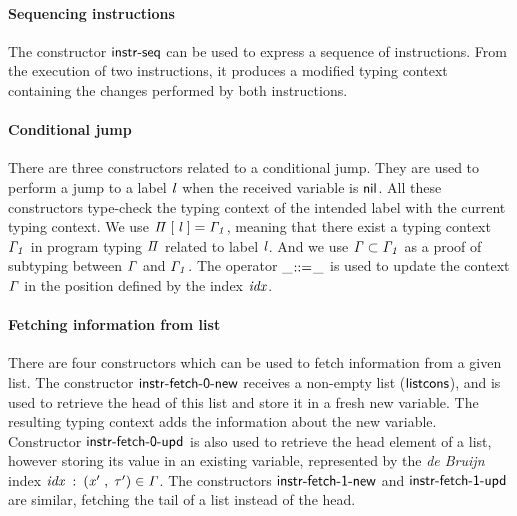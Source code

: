 \documentclass[sigconf]{acmart}
\theoremstyle{definition}
\newcommand{\D}[1]{\blue{\mathsf{#1}}}
\newcommand{\Con}[1]{\red{\mathsf{#1}}}
\newcommand{\F}[1]{\green{\mathsf{#1}}}
\newcommand{\V}[1]{\purple{\mathit{#1}}}
\begin{document}
\paragraph{Sequencing instructions}{The constructor \ensuremath{\Con{instr\textrm{-}seq}} can be used to
express a sequence of instructions. From the execution of two instructions, it
produces a modified typing context containing the changes performed by
both instructions.}

\paragraph{Conditional jump}{There are three constructors related to a conditional
jump. They are used to perform a jump to a label \ensuremath{\V{l}} when the received variable is \ensuremath{\Con{nil}}.
All these constructors type-check the typing context of the intended label with the
current typing context. We use \ensuremath{\V{\Pi}\;\D{[}\;\V{l}\;\D{]=}\;\V{\Gamma_1}}, meaning that there exist a typing context
\ensuremath{\V{\Gamma_1}} in program typing \ensuremath{\V{\Pi}} related to label \ensuremath{\V{l}}. And we use \ensuremath{\V{\Gamma}\;\D{\subset}\;\V{\Gamma_1}} as a proof of
subtyping between \ensuremath{\V{\Gamma}} and \ensuremath{\V{\Gamma_1}}. The operator \ensuremath{\F{\_\hspace{-2pt}::=\hspace{-2pt}\_}} is used to update the context \ensuremath{\V{\Gamma}}
in the position defined by the index \ensuremath{\V{idx}}.}

\paragraph{Fetching information from list}{There are four constructors which can be used
to fetch information from a given list. The constructor \ensuremath{\Con{instr\textrm{-}fetch\textrm{-}0\textrm{-}new}} receives a
non-empty list (\ensuremath{\Con{listcons}}), and is used to retrieve the head of this list and store it
in a fresh new variable. The resulting typing context adds the information about the new
variable. Constructor \ensuremath{\Con{instr\textrm{-}fetch\textrm{-}0\textrm{-}upd}} is also used to retrieve the head element of a
list, however storing its value in an existing variable, represented by the \emph{de Bruijn}
index \ensuremath{\V{idx}\;\mathbin{:}\;(\V{x'}\;\red{,}\,\;\V{\tau'})\;\D{\in}\;\V{\Gamma}}. The constructors \ensuremath{\Con{instr\textrm{-}fetch\textrm{-}1\textrm{-}new}} and \ensuremath{\Con{instr\textrm{-}fetch\textrm{-}1\textrm{-}upd}}
are similar, fetching the tail of a list instead of the head.}
\end{document}
